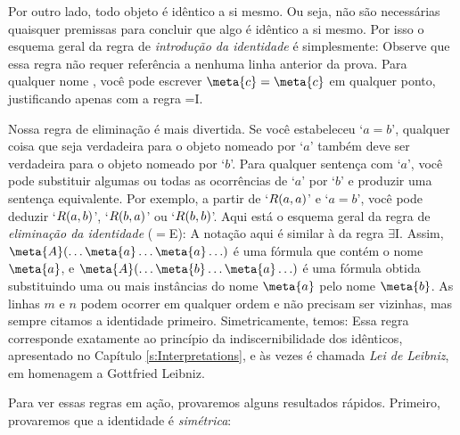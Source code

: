 Por outro lado, todo objeto é idêntico a si mesmo. Ou seja, não são necessárias quaisquer premissas para concluir que algo é idêntico a si mesmo. Por isso o esquema geral da regra de \textit{introdução da identidade} é simplesmente:
Observe que essa regra não requer referência a nenhuma linha anterior da prova. Para qualquer nome , você pode escrever $\meta{c}=\meta{c}$ em qualquer ponto, justificando apenas com a regra  {=}I.
 
Nossa regra de eliminação é mais divertida. Se você estabeleceu `$a=b$',  qualquer coisa que seja verdadeira para o objeto nomeado por `$a$' também deve ser verdadeira para o objeto nomeado por `$b$'. Para qualquer sentença com `$a$', você pode substituir algumas ou todas as ocorrências de `$a$' por `$b$' e produzir uma sentença equivalente. Por exemplo,  a partir de `$\mathord{R}(a,a)$' e `$a = b$',  você pode deduzir `$\mathord{R}(a,b)$', `$\mathord{R}(b,a)$' ou `$\mathord{R}(b,b)$'. Aqui está o esquema geral da regra de \textit{eliminação da identidade} ($=$E):
A notação aqui é similar à da regra $\exists$I. Assim, $\meta{A}(\ldots \meta{a} \ldots \meta{a}\ldots)$ é uma fórmula que contém o nome $\meta{a}$, e $\meta{A}(\ldots \meta{b} \ldots \meta{a}\ldots)$ é uma fórmula obtida substituindo uma ou mais instâncias do nome $\meta{a}$ pelo nome $\meta{b}$. As linhas $m$ e $n$ podem ocorrer em qualquer ordem e não precisam ser vizinhas, mas sempre citamos a identidade primeiro. Simetricamente, temos:
Essa regra corresponde exatamente ao princípio da indiscernibilidade dos idênticos, apresentado no Capítulo \ref{s:Interpretations}, e às vezes é chamada  \emph{Lei de Leibniz}, em homenagem a Gottfried Leibniz. 

Para ver essas regras em ação, provaremos alguns resultados rápidos. Primeiro, provaremos que a identidade é  \emph{simétrica}:

